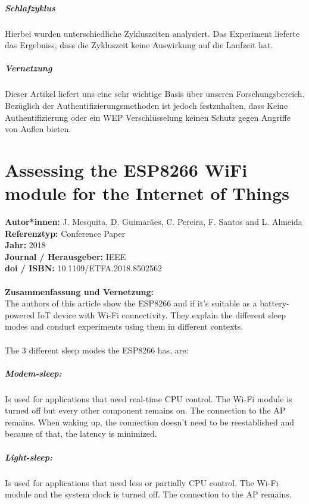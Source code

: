 \documentclass{report}
\begin{document}
\paragraph{Schlafzyklus} Hierbei wurden unterschiedliche Zykluszeiten analysiert.
Das Experiment lieferte das Ergebniss, dass die Zykluszeit keine Auswirkung auf die Laufzeit hat.

\paragraph{Vernetzung} Dieser Artikel liefert uns eine sehr wichtige Basis über unseren Forschungsbereich. Bezüglich der Authentifizierungsmethoden ist jedoch festzuhalten, dass Keine Authentifizierung oder ein WEP Verschlüsselung keinen Schutz gegen Angriffe von Außen bieten.

{\let\clearpage\relax \chapter{Assessing the ESP8266 WiFi module for the Internet of Things}}
\noindent
\textbf{Autor*innen:} J. Mesquita, D. Guimarães, C. Pereira, F. Santos and L. Almeida\\
\textbf{Referenztyp:} Conference Paper\\
\textbf{Jahr:} 2018\\
\textbf{Journal / Herausgeber:} IEEE\\
\textbf{doi / ISBN:} 10.1109/ETFA.2018.8502562\\\\
\textbf{Zusammenfassung und Vernetzung:}\\
The authors of this article show the ESP8266 and if it's suitable as a battery-powered IoT device with Wi-Fi connectivity.
They explain the different sleep modes and conduct experiments using them in different contexts.\\\\
The 3 different sleep modes the ESP8266 has, are:\\
\paragraph{Modem-sleep:} Is used for applications that need real-time CPU control. The Wi-Fi module is turned off but every other component remains on. The connection to the AP remains. When waking up, the connection doesn't need to be reestablished and because of that, the latency is minimized.
\paragraph{Light-sleep:} Is used for applications that need less or partially CPU control. The Wi-Fi module and the system clock is turned off. The connection to the AP remains.
\end{document}
